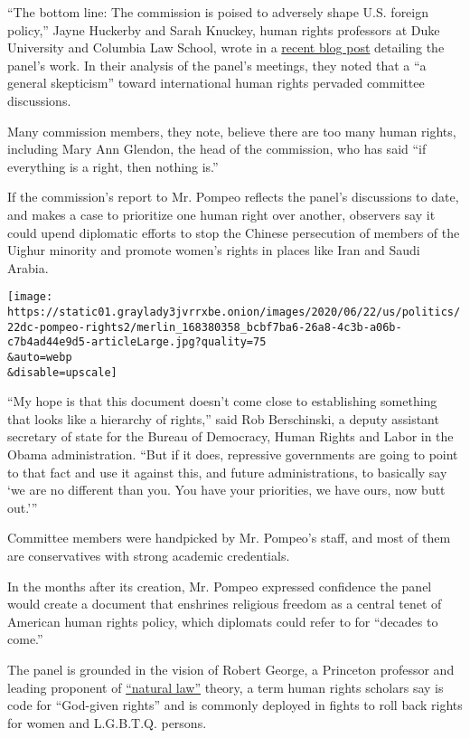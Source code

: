 ``The bottom line: The commission is poised to adversely shape U.S.
foreign policy,'' Jayne Huckerby and Sarah Knuckey, human rights
professors at Duke University and Columbia Law School, wrote in a
\href{https://www.justsecurity.org/69150/pompeos-rights-commission-is-worse-than-feared-part-i/}{recent
blog post} detailing the panel's work. In their analysis of the panel's
meetings, they noted that a ``a general skepticism'' toward
international human rights pervaded committee discussions.

Many commission members, they note, believe there are too many human
rights, including Mary Ann Glendon, the head of the commission, who has
said ``if everything is a right, then nothing is.''

If the commission's report to Mr. Pompeo reflects the panel's
discussions to date, and makes a case to prioritize one human right over
another, observers say it could upend diplomatic efforts to stop the
Chinese persecution of members of the Uighur minority and promote
women's rights in places like Iran and Saudi Arabia.

\texttt{[image: https://static01.graylady3jvrrxbe.onion/images/2020/06/22/us/politics/22dc-pompeo-rights2/merlin\_168380358\_bcbf7ba6-26a8-4c3b-a06b-c7b4ad44e9d5-articleLarge.jpg?quality=75\\\&auto=webp\\\&disable=upscale]}

``My hope is that this document doesn't come close to establishing
something that looks like a hierarchy of rights,'' said Rob Berschinski,
a deputy assistant secretary of state for the Bureau of Democracy, Human
Rights and Labor in the Obama administration. ``But if it does,
repressive governments are going to point to that fact and use it
against this, and future administrations, to basically say `we are no
different than you. You have your priorities, we have ours, now butt
out.'''

Committee members were handpicked by Mr. Pompeo's staff, and most of
them are conservatives with strong academic credentials.

In the months after its creation, Mr. Pompeo expressed confidence the
panel would create a document that enshrines religious freedom as a
central tenet of American human rights policy, which diplomats could
refer to for ``decades to come.''

The panel is grounded in the vision of Robert George, a Princeton
professor and leading proponent of
\href{https://www.britannica.com/topic/natural-law}{``natural law''}
theory, a term human rights scholars say is code for ``God-given
rights'' and is commonly deployed in fights to roll back rights for
women and L.G.B.T.Q. persons.


